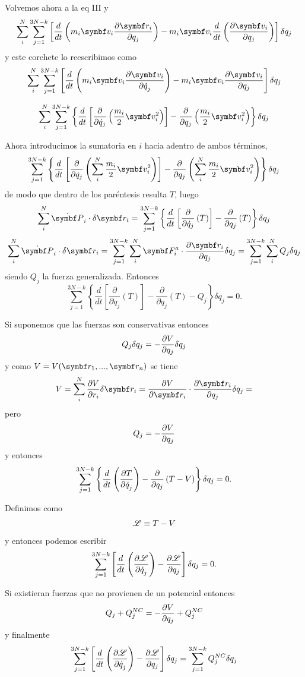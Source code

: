 \documentclass[10pt,oneside]{CBFT_book}
\begin{document}
Volvemos ahora a la eq III y 
\[
	\sum_i^N \sum_{j=1}^{3N-k} \left[ 
	\frac{d}{dt} \left( m_i \vb{v}_i \dpar{\vb{r}_i}{q_j} \right) - 
	m_i \vb{v}_i \frac{d}{dt}\left( \dpar{\vb{v}_i}{q_j} \right) \right] \delta q_j
\]
y este corchete lo reescribimos como 
\[
	\sum_i^N \sum_{j=1}^{3N-k} \left[ 
	\frac{d}{dt} \left( m_i \vb{v}_i \dpar{\vb{v}_i}{\dot{q}_j} \right) -
	m_i \vb{v}_i \dpar{\vb{v}_i}{q_j} \right] \delta q_j
\]

\[
	\sum_i^N \sum_{j=1}^{3N-k} \left\{ 
	\frac{d}{dt} \left[ \frac{\partial}{\partial \dot{q}_j} \left( \frac{m_i}{2} \vb{v}_i^2 \right) \right] - 
	\frac{\partial}{\partial q_j} \left( \frac{m_i}{2} \vb{v}_i^2 \right) \right\} \delta q_j
\]

Ahora introducimos la sumatoria en $i$ hacia adentro de ambos términos,
\[
	\sum_{j=1}^{3N-k} \left\{ 
	\frac{d}{dt} \left[ \frac{\partial}{\partial \dot{q}_j}
	\left( \sum_i^N \frac{m_i}{2} \vb{v}_i^2 \right) \right] 
	-  \frac{\partial}{\partial q_j} \left( \sum_i^N \frac{m_i}{2} \vb{v}_i^2 \right) \right\} \delta q_j
\]
de modo que dentro de los paréntesis resulta $T$, luego 
\[
	\sum_i^N \dot{\vb{P}}_i \cdot \delta \vb{r}_i = 
	\sum_{j=1}^{3N-k} \left\{ \frac{d}{dt} \left[ \frac{\partial}{\partial \dot{q}_j} \left( T \right) \right] - 
	\frac{\partial}{\partial q_j} \left( T \right) \right\} \delta q_j
\]
\[
	\sum_i^N \dot{\vb{P}}_i \cdot \delta \vb{r}_i = 
	\sum_{j=1}^{3N-k} \sum_i^N \vb{F}_i^a \cdot \dpar{\vb{r}_i}{q_j} \delta q_j =  
	\sum_{j=1}^{3N-k} \sum_i^N Q_j \delta q_j
\]
siendo $Q_j$ la fuerza generalizada. Entonces
\[
	\sum_{j=1}^{3N-k} \left\{ \frac{d}{dt}
	\left[ \frac{\partial}{\partial \dot{q}_j} \left( T \right) \right] - \frac{\partial}{\partial q_j}
	\left( T \right) - Q_j \right\} \delta q_j =  0.
\]

Si suponemos que las fuerzas son conservativas entonces 
\[
	Q_j \delta q_j = -\frac{\partial^{\hspace{-0.05em}} {V}}{\partial {q_j}^{\hspace{-0.05em}}}\delta q_j
\]
y como $V=V(\vb{r}_1,...,\vb{r}_n)$ se tiene 
\[
	V = \sum_i^N  \dpar{V}{r_i} \delta \vb{r}_i = \dpar{V}{\vb{r}_i} \cdot \dpar{\vb{r}_i}{q_j} \delta q_j =
\]
pero 
\[
	Q_j = - \frac{\partial^{\hspace{-0.05em}} {V}}{\partial {q_j}^{\hspace{-0.05em}}}
\]
y entonces 
\[
	\sum_{j=1}^{3N-k} \left\{ 
	\frac{d}{dt} \left( \frac{\partial^{\hspace{-0.05em}} {T}}{\partial {\dot{q}_j}^{\hspace{-0.05em}}} \right) - \frac{\partial}{\partial q_j}
	\left( T - V \right) \right\} \delta q_j =  0.
\]

Definimos como 
\[
	\mathscr{L} \equiv T - V
\]
y entonces podemos escribir
\[
	\sum_{j=1}^{3N-k} \left[
	\frac{d}{dt} \left( \frac{\partial^{\hspace{-0.05em}} {\mathscr{L}}}{\partial {\dot{q}_j}^{\hspace{-0.05em}}} \right) -  \frac{\partial^{\hspace{-0.05em}} {\mathscr{L}}}{\partial {q_j}^{\hspace{-0.05em}}} \right] \delta q_j =  0.
\]

Si existieran fuerzas que no provienen de un potencial entonces
\[
	Q_j + Q_j^{NC} = -\frac{\partial^{\hspace{-0.05em}} {V}}{\partial {q_j}^{\hspace{-0.05em}}} + Q_j^{NC}
\]
y finalmente 
\[
	\sum_{j=1}^{3N-k} \left[
	\frac{d}{dt} \left( \frac{\partial^{\hspace{-0.05em}} {\mathscr{L}}}{\partial {\dot{q}_j}^{\hspace{-0.05em}}} \right) -  \frac{\partial^{\hspace{-0.05em}} {\mathscr{L}}}{\partial {q_j}^{\hspace{-0.05em}}} \right] \delta q_j = 
	\sum_{j=1}^{3N-k} Q_j^{NC} \delta q_j
\]
\end{document}
